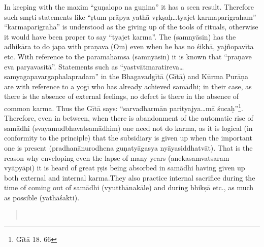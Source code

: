 In keeping with the maxim “guṇalopo na guṇina” it has a seen result. Therefore such smṛti statements like “ṛtum prāpya yathā vṛkṣaḥ…tyajet karmaparigraham” “karmaparigraha” is understood as the giving up of the tools of rituals, otherwise it would have been proper to say “tyajet karma”. The (samnyāsin) has the adhikāra to do japa with praṇava (Om) even when he has no śikhā, yajñopavīta etc.  With reference to the paramahamsa (samnyāsin) it is known that “praṇave eva paryavasitā”. Statements such as “yastvātmaratireva… samyagapavargaphalapradam” in the Bhagavadgītā (Gītā) and Kūrma Purāṇa are with reference to a yogī who has already achieved samādhi; in their case, as there is the absence of external feelings, no defect is there in the absence of common karma. Thus the Gītā says: “sarvadharmān parityajya…mā śucaḥ”\footnote{Gītā 18. 66}. Therefore, even in between, when there is abandonment of the automatic rise of samādhi (svayamudbhavatsamādhim) one need not do karma, as it is logical (in conformity to the principle) that the subsidiary is given up when the important one is present (pradhanānurodhena guṇatyāgasya nyāyasiddhatvāt). That is the reason why enveloping even the lapse of many years (anekasamvatsaram vyāpyāpi) it is heard of great ṛṣis being absorbed in samādhi having given up both external and internal karma.They also practice internal sacrifice during the time of coming out of samādhi (vyutthānakāle) and during bhikṣā etc., as much as possible (yathāśakti).

\begin{verse}
\\
\end{verse}


